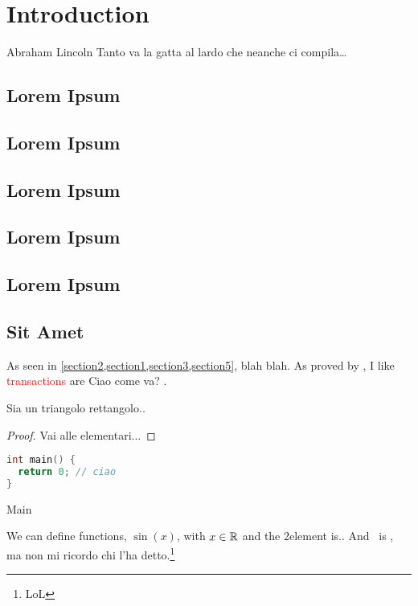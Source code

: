 
\chapter{Introduction}

\begin{epigraph}{Abraham Lincoln}
Tanto va la gatta al lardo che neanche ci compila\ldots
\end{epigraph}

\section{Lorem Ipsum}
\label{section1}
\lipsum[1-5]

\section{Lorem Ipsum}
\label{section2}
\lipsum[1-5]

\section{Lorem Ipsum}
\label{section3}
\lipsum[1-5]

\section{Lorem Ipsum}
\label{section4}
\lipsum[1-5]

\section{Lorem Ipsum}
\label{section5}
\lipsum[1-5]

\section{Sit Amet}
As seen in \cref{section2,section1,section3,section5}, blah blah.
As proved by \citet{MiculanPT15}, I like 
\textcolor{red}{transactions}  are 
{\tiny Ciao} come va?
.

\begin{theorem}
Sia un triangolo rettangolo..
\end{theorem}
\begin{proof}
Vai alle elementari...
\end{proof}

\begin{listing}

\begin{lstlisting}[language=c]
int main() {
  return 0; // ciao
}
\end{lstlisting}
\caption{Main}
\label{lst:main}
\end{listing}


We can define functions, \eg $\sin(x)$, with $x\in\mathbb{R}$ and the 2\nd element 
is.. And \SAT\ is \NP\complete, ma non mi ricordo chi l'ha 
detto\citationeeded.\footnote{LoL}




